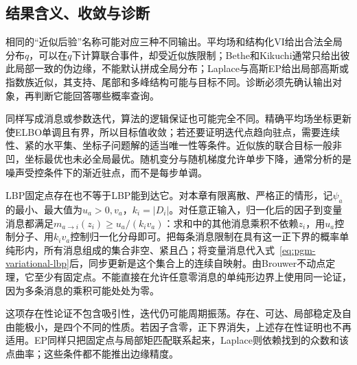 \subsection{结果含义、收敛与诊断}
\label{sec:pgm-variational-results-diagnostics}
\label{sec:pgm-variational-analysis}
\label{sec:pgm-variational-convergence}
\label{sec:pgm-variational-complexity}
\label{sec:pgm-variational-diagnostics}

相同的“近似后验”名称可能对应三种不同输出。平均场和结构化VI给出合法全局分布$q$，可以在$q$下计算联合事件，却受近似族限制；Bethe和Kikuchi通常只给出彼此局部一致的伪边缘，不能默认拼成全局分布；Laplace与高斯EP给出局部高斯或指数族近似，其支持、尾部和多峰结构可能与目标不同。诊断必须先确认输出对象，再判断它能回答哪些概率查询。

同样写成消息或参数迭代，算法的逻辑保证也可能完全不同。精确平均场坐标更新使ELBO单调且有界，所以目标值收敛；若还要证明迭代点趋向驻点，需要连续性、紧的水平集、坐标子问题解的适当唯一性等条件。近似族的联合目标一般非凹，坐标最优也未必全局最优。随机变分与随机梯度允许单步下降，通常分析的是噪声受控条件下的渐近驻点，而不是每步单调。

LBP固定点存在也不等于LBP能到达它。对本章有限离散、严格正的情形，记$\psi_a$的最小、最大值为$u_a>0,v_a$，$k_i=|D_i|$。对任意正输入，归一化后的因子到变量消息都满足$m_{a\to i}(z_i)\geq u_a/(k_iv_a)$：求和中的其他消息乘积不依赖$z_i$，用$u_a$控制分子、用$k_iv_a$控制归一化分母即可。把每条消息限制在具有这一正下界的概率单纯形内，所有消息组成的集合非空、紧且凸；将变量消息代入式~\eqref{eq:pgm-variational-lbp}后，同步更新是这个集合上的连续自映射。由Brouwer不动点定理，它至少有固定点。不能直接在允许任意零消息的单纯形边界上使用同一论证，因为多条消息的乘积可能处处为零。

这项存在性论证不包含吸引性，迭代仍可能周期振荡。存在、可达、局部稳定及自由能极小，是四个不同的性质。若因子含零，正下界消失，上述存在性证明也不再适用。EP同样只把固定点与局部矩匹配联系起来，Laplace则依赖找到的众数和该点曲率；这些条件都不能推出边缘精度。

